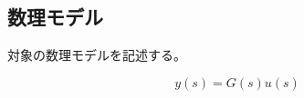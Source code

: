\documentclass[dvipdfmx,usejistfm]{ieej-tec2}
\begin{document}

\subsection{数理モデル}
対象の数理モデルを記述する。

\begin{equation}
  y(s) = G(s)u(s)
  \label{eq:example}
\end{equation}




%
\end{document}
